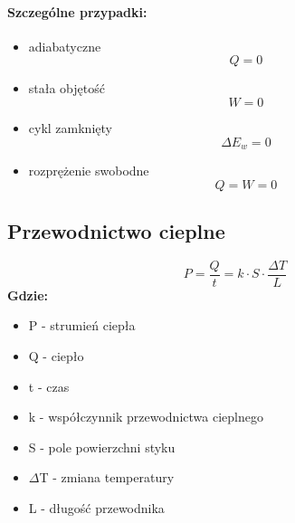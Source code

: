 \documentclass{article}
\begin{document}
            \paragraph{Szczególne przypadki:}
                \begin{itemize}
                    \item adiabatyczne
                    \begin{equation}
                        Q = 0
                    \end{equation}
                    \item stała objętość
                    \begin{equation}
                        W = 0
                    \end{equation}
                    \item cykl zamknięty
                    \begin{equation}
                        \Delta E_w = 0
                    \end{equation}
                    \item rozprężenie swobodne
                    \begin{equation}
                        Q = W = 0
                    \end{equation}
                \end{itemize}

        \subsection{Przewodnictwo cieplne}
            \begin{equation}
                P = \frac{Q}{t} = k \cdotp S \cdotp \frac{\Delta T}{L}
            \end{equation}
            \textbf{Gdzie:}
                \begin{itemize}
                    \item P - strumień ciepła
                    \item Q - ciepło
                    \item t - czas
                    \item k - współczynnik przewodnictwa cieplnego
                    \item S - pole powierzchni styku
                    \item $\Delta$T - zmiana temperatury
                    \item L - długość przewodnika
                \end{itemize}
\end{document}
